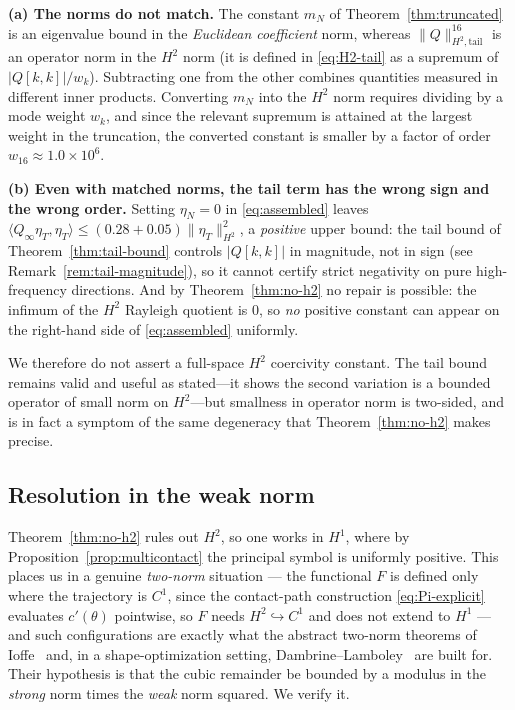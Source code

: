 \documentclass[11pt]{amsart}
\theoremstyle{plain}
\theoremstyle{definition}
\begin{document}
\textbf{(a) The norms do not match.}  The constant $m_{N}$ of
Theorem~\ref{thm:truncated} is an eigenvalue bound in the
\emph{Euclidean coefficient} norm, whereas
$\|Q\|^{16}_{H^{2},\mathrm{tail}}$ is an operator norm in the
\emph{$H^{2}$} norm (it is defined in \eqref{eq:H2-tail} as a
supremum of $|Q[k,k]|/w_{k}$).  Subtracting one from the other
combines quantities measured in different inner products.  Converting
$m_{N}$ into the $H^{2}$ norm requires dividing by a mode weight
$w_{k}$, and since the relevant supremum is attained at the largest
weight in the truncation, the converted constant is smaller by a
factor of order $w_{16} \approx 1.0\times10^{6}$.

\textbf{(b) Even with matched norms, the tail term has the wrong
sign and the wrong order.}  Setting $\eta_{N} = 0$ in
\eqref{eq:assembled} leaves
$\langle Q_{\infty}\eta_{T},\eta_{T}\rangle \leq (0.28 + 0.05)
\|\eta_{T}\|^{2}_{H^{2}}$, a \emph{positive} upper bound: the tail
bound of Theorem~\ref{thm:tail-bound} controls $|Q[k,k]|$ in
magnitude, not in sign (see Remark~\ref{rem:tail-magnitude}), so it
cannot certify strict negativity on pure high-frequency directions.
And by Theorem~\ref{thm:no-h2} no repair is possible: the infimum of
the $H^{2}$ Rayleigh quotient is $0$, so \emph{no} positive constant
can appear on the right-hand side of \eqref{eq:assembled} uniformly.

We therefore do not assert a full-space $H^{2}$ coercivity constant.
The tail bound remains valid and useful as stated---it shows the
second variation is a bounded operator of small norm on $H^{2}$---but
smallness in operator norm is two-sided, and is in fact a symptom of
the same degeneracy that Theorem~\ref{thm:no-h2} makes precise.

\subsection{Resolution in the weak norm}\label{sec:two-norm}

Theorem~\ref{thm:no-h2} rules out $H^{2}$, so one works in $H^{1}$,
where by Proposition~\ref{prop:multicontact} the principal symbol is
uniformly positive.  This places us in a genuine \emph{two-norm}
situation --- the functional $F$ is defined only where the trajectory
is $C^{1}$, since the contact-path construction
\eqref{eq:Pi-explicit} evaluates $c'(\theta)$ pointwise, so $F$ needs
$H^{2}\hookrightarrow C^{1}$ and does not extend to $H^{1}$ --- and
such configurations are exactly what the abstract two-norm theorems of
Ioffe~\cite{Ioffe1979} and, in a shape-optimization setting,
Dambrine--Lamboley~\cite{DambrineLamboley} are built for.  Their
hypothesis is that the cubic remainder be bounded by a modulus in the
\emph{strong} norm times the \emph{weak} norm squared.  We verify it.
\end{document}
